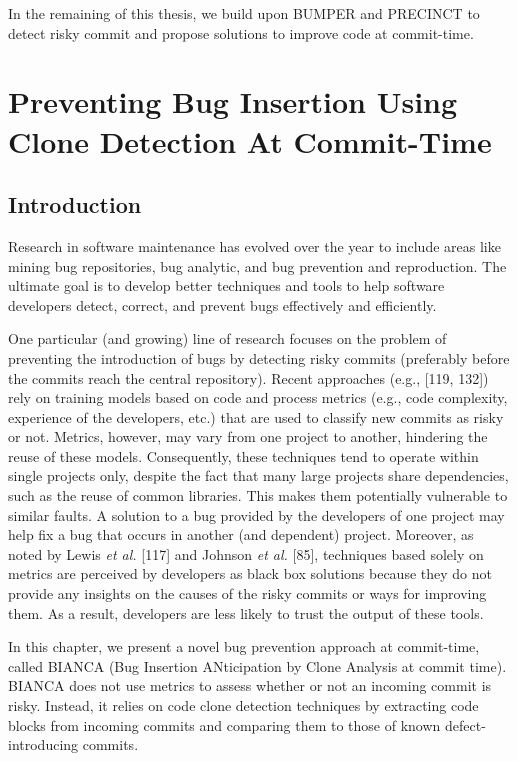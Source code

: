 \documentclass[12pt]{report}
\begin{document}
In the remaining of this thesis, we build upon BUMPER and PRECINCT to
detect risky commit and propose solutions to improve code at
commit-time.

\chapter{Preventing Bug Insertion Using Clone Detection At
Commit-Time}\label{preventing-bug-insertion-using-clone-detection-at-commit-time}

\section{Introduction}\label{introduction-3}

Research in software maintenance has evolved over the year to include
areas like mining bug repositories, bug analytic, and bug prevention and
reproduction. The ultimate goal is to develop better techniques and
tools to help software developers detect, correct, and prevent bugs
effectively and efficiently.

One particular (and growing) line of research focuses on the problem of
preventing the introduction of bugs by detecting risky commits
(preferably before the commits reach the central repository). Recent
approaches (e.g., {[}119, 132{]}) rely on training models based on code
and process metrics (e.g., code complexity, experience of the
developers, etc.) that are used to classify new commits as risky or not.
Metrics, however, may vary from one project to another, hindering the
reuse of these models. Consequently, these techniques tend to operate
within single projects only, despite the fact that many large projects
share dependencies, such as the reuse of common libraries. This makes
them potentially vulnerable to similar faults. A solution to a bug
provided by the developers of one project may help fix a bug that occurs
in another (and dependent) project. Moreover, as noted by Lewis \emph{et
al.} {[}117{]} and Johnson \emph{et al.} {[}85{]}, techniques based
solely on metrics are perceived by developers as black box solutions
because they do not provide any insights on the causes of the risky
commits or ways for improving them. As a result, developers are less
likely to trust the output of these tools.

In this chapter, we present a novel bug prevention approach at
commit-time, called BIANCA (Bug Insertion ANticipation by Clone Analysis
at commit time). BIANCA does not use metrics to assess whether or not an
incoming commit is risky. Instead, it relies on code clone detection
techniques by extracting code blocks from incoming commits and comparing
them to those of known defect-introducing commits.
\end{document}
